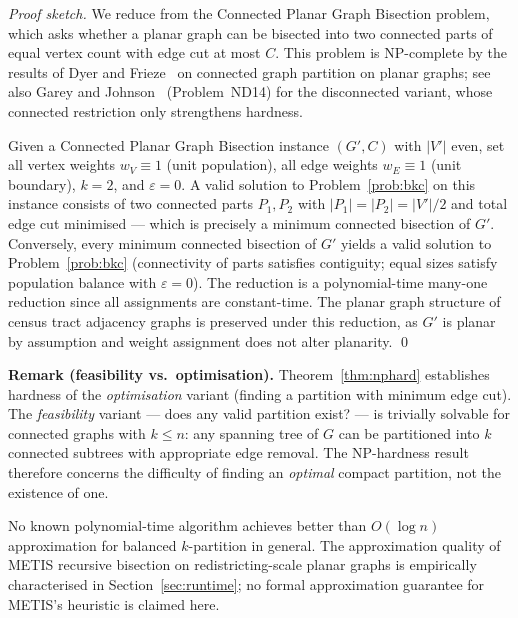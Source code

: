 \begin{proof}[Proof sketch]
We reduce from the Connected Planar Graph Bisection problem, which asks
whether a planar graph can be bisected into two connected parts of equal
vertex count with edge cut at most $C$.
This problem is NP-complete by the results of Dyer and
Frieze~\citep{dyer1985partitioning} on connected graph partition on
planar graphs; see also Garey and Johnson~\citep{garey1979computers}
(Problem~ND14) for the disconnected variant, whose connected restriction
only strengthens hardness.

Given a Connected Planar Graph Bisection instance $(G', C)$ with $|V'|$
even, set all vertex weights $w_V \equiv 1$ (unit population), all edge
weights $w_E \equiv 1$ (unit boundary), $k = 2$, and $\varepsilon = 0$.
A valid solution to Problem~\ref{prob:bkc} on this instance consists of
two connected parts $P_1, P_2$ with $|P_1| = |P_2| = |V'|/2$ and total
edge cut minimised — which is precisely a minimum connected bisection of
$G'$.
Conversely, every minimum connected bisection of $G'$ yields a valid
solution to Problem~\ref{prob:bkc} (connectivity of parts satisfies
contiguity; equal sizes satisfy population balance with $\varepsilon = 0$).
The reduction is a polynomial-time many-one reduction since all
assignments are constant-time.
The planar graph structure of census tract adjacency graphs is preserved
under this reduction, as $G'$ is planar by assumption and weight
assignment does not alter planarity. \qed
\end{proof}

\noindent\textbf{Remark (feasibility vs.\ optimisation).}
Theorem~\ref{thm:nphard} establishes hardness of the \emph{optimisation}
variant (finding a partition with minimum edge cut).
The \emph{feasibility} variant --- does any valid partition exist? ---
is trivially solvable for connected graphs with $k \leq n$: any spanning
tree of $G$ can be partitioned into $k$ connected subtrees with
appropriate edge removal.
The NP-hardness result therefore concerns the difficulty of finding
an \emph{optimal} compact partition, not the existence of one.

\begin{proposition}
\label{prop:approx}
No known polynomial-time algorithm achieves better than $O(\log n)$
approximation for balanced $k$-partition in general.
The approximation quality of METIS recursive bisection on redistricting-scale
planar graphs is empirically characterised in Section~\ref{sec:runtime};
no formal approximation guarantee for METIS's heuristic is claimed here.
\end{proposition}

